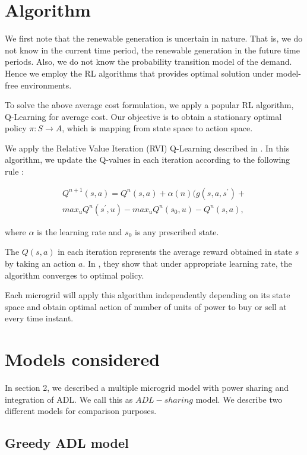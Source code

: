 \section{Algorithm}
We first note that the renewable generation is uncertain in nature. That is, we do not know in the current time period, the renewable generation in the future time periods. Also, we do not know the probability transition model of the demand. Hence we employ the RL algorithms that provides optimal solution under model-free environments.

To solve the above average cost formulation, we apply a popular RL algorithm, Q-Learning for average cost. Our objective is to obtain a stationary optimal policy $\pi : S \rightarrow A$, which is mapping from state space to action space.  

We apply the Relative Value Iteration (RVI) Q-Learning described in \cite{avgcost}. In this algorithm, we update the Q-values in each iteration according to the following rule :

\begin{align}
Q^{n+1}(s,a) = Q^{n}(s,a) + \alpha(n)(g(s,a,s^{'}) + \\ max_{u} Q^{n}(s^{'},u) - max_{u} Q^{n}(s_{0},u) - Q^{n}(s,a),
\end{align}

where $\alpha$ is the learning rate and $s_{0}$ is any prescribed state.

The $Q(s,a)$ in each iteration represents the average reward obtained in state $s$ by taking an action $a$. In \cite{avgcost}, they show that under appropriate learning rate, the algorithm converges to optimal policy. 

Each microgrid will apply this algorithm independently depending on its state space and obtain optimal action of number of units of power to buy or sell at every time instant. 

\section{Models considered}

In section 2, we described a multiple microgrid model with power sharing and integration of ADL. We call this as $ADL-sharing$ model. We describe two different models for comparison purposes. 

\subsection{Greedy ADL model}

